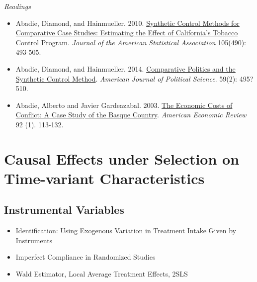 \documentclass{article}
\begin{document}
\emph{Readings}
\begin{itemize}
\item Abadie, Diamond, and Hainmueller. 2010.  \href{http://www.tandfonline.com/doi/abs/10.1198/jasa.2009.ap08746#.Voip1jZh23I} {Synthetic Control Methods for Comparative Case Studies: Estimating the Effect of California's Tobacco Control Program}. \textit{Journal of the American Statistical Association} 105(490):  493-505.%

\item Abadie, Diamond, and Hainmueller. 2014.  \href{https://web.stanford.edu/~jhain/Paper/AJPS2015a.pdf} {Comparative Politics and the Synthetic Control Method}. \textit{American Journal of Political Science}. 59(2): 495?510. %

\item Abadie, Alberto and Javier Gardeazabal. 2003.  \href{http://pubs.aeaweb.org/doi/pdfplus/10.1257/000282803321455188} {The Economic Costs of Conflict: A Case Study of the Basque Country}. \textit{American Economic Review} 92 (1). 113-132.
\end{itemize}

\section{Causal Effects under Selection on Time-variant Characteristics}

\subsection{Instrumental Variables}

\begin{itemize}
\item Identification: Using Exogenous Variation in Treatment Intake Given by Instruments
\item Imperfect Compliance in Randomized Studies
\item Wald Estimator, Local Average Treatment Effects, 2SLS
\end{itemize}
\end{document}
